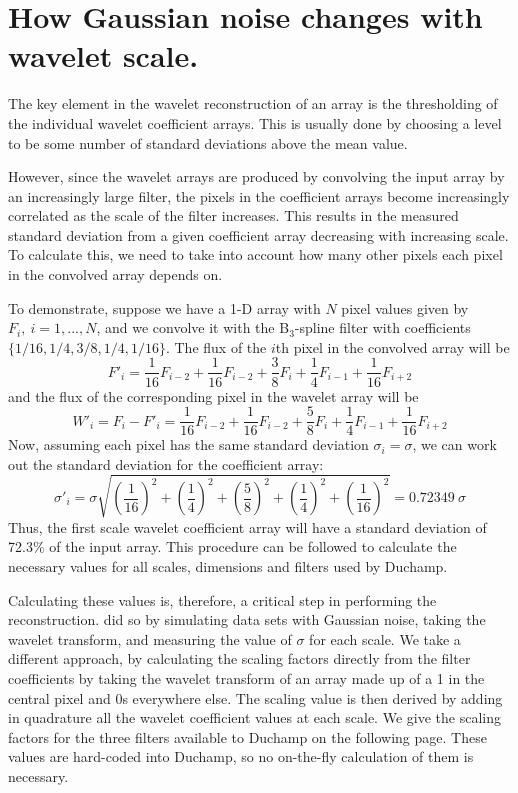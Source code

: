 \documentclass[12pt,a4paper]{article}
\newcommand{\hipass}{{\sc hipass}}
\begin{document}

\section{How Gaussian noise changes with wavelet scale.}
\label{app-scaling}

The key element in the wavelet reconstruction of an array is the
thresholding of the individual wavelet coefficient arrays. This is
usually done by choosing a level to be some number of standard
deviations above the mean value.

However, since the wavelet arrays are produced by convolving the input
array by an increasingly large filter, the pixels in the coefficient
arrays become increasingly correlated as the scale of the filter
increases. This results in the measured standard deviation from a
given coefficient array decreasing with increasing scale. To calculate
this, we need to take into account how many other pixels each pixel in
the convolved array depends on.

To demonstrate, suppose we have a 1-D array with $N$ pixel values
given by $F_i,\ i=1,...,N$, and we convolve it with the B$_3$-spline
filter with coefficients $\{1/16,1/4,3/8,1/4,1/16\}$. The flux of the
$i$th pixel in the convolved array will be
\[
F'_i = \frac{1}{16}F_{i-2} + \frac{1}{16}F_{i-2} + \frac{3}{8}F_{i}
+ \frac{1}{4}F_{i-1} + \frac{1}{16}F_{i+2}
\]
and the flux of the corresponding pixel in the wavelet array will be 
\[
W'_i = F_i - F'_i = \frac{1}{16}F_{i-2} + \frac{1}{16}F_{i-2} + \frac{5}{8}F_{i}
+ \frac{1}{4}F_{i-1} + \frac{1}{16}F_{i+2}
\]
Now, assuming each pixel has the same standard deviation
$\sigma_i=\sigma$, we can work out the standard deviation for the
coefficient array:
\[
\sigma'_i = \sigma \sqrt{\left(\frac{1}{16}\right)^2 + \left(\frac{1}{4}\right)^2
  + \left(\frac{5}{8}\right)^2 + \left(\frac{1}{4}\right)^2 + \left(\frac{1}{16}\right)^2}
          = 0.72349\ \sigma
\]
Thus, the first scale wavelet coefficient array will have a standard
deviation of 72.3\% of the input array. This procedure can be followed
to calculate the necessary values for all scales, dimensions and
filters used by Duchamp.

Calculating these values is, therefore, a critical step in performing
the reconstruction. \citet{starck02:book} did so by simulating data sets
with Gaussian noise, taking the wavelet transform, and measuring the
value of $\sigma$ for each scale. We take a different approach, by
calculating the scaling factors directly from the filter coefficients
by taking the wavelet transform of an array made up of a 1 in the
central pixel and 0s everywhere else. The scaling value is then
derived by adding in quadrature all the wavelet coefficient values at
each scale. We give the scaling factors for the three filters
available to Duchamp on the following page. These values are
hard-coded into Duchamp, so no on-the-fly calculation of them is
necessary. 
\end{document}
